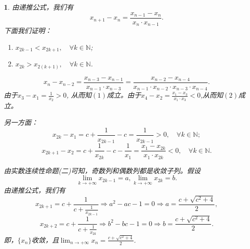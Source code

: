 \documentclass[utf8]{book}
\newtheorem{solution}{}
\begin{document}
\begin{solution}
由递推公式，我们有
$$x_{n+1}-x_{n} = \frac{x_{n-1}- x_n}{x_n\cdot x_{n-1}}.$$
下面我们证明：
\renewcommand\labelenumi{\normalfont(\theenumi)}
\begin{enumerate}
\item $x_{2k-1} < x_{2k+1},\quad\forall k\in\mathbb{N}$;
\item $x_{2k} > x_{2(k+1)},\quad\forall k\in\mathbb{N}$.
\end{enumerate}
$$x_{n}-x_{n-2} = \frac{x_{n-3} - x_{n-1}}{x_{n-1}\cdot x_{n-3}} = \frac{x_{n-2} - x_{n-4}}{x_{n-1}\cdot x_{n-2}\cdot x_{n-3}\cdot x_{n-4}}.$$
由于$x_3-x_1 = \displaystyle\frac{1}{x_2} > 0$, 从而知$(1)$成立。由于$x_4-x_2 = \displaystyle\frac{x_1-x_3}{x_1\cdot x_3} < 0$,从而知$(2)$成立。

另一方面：
$$x_{2k}-x_1 = c+\frac{1}{x_{2k-1}}-c = \frac{1}{x_{2k-1}} > 0,\quad \forall k\in\mathbb{N};$$
$$x_{2k+1} - x_2 = c+\frac{1}{x_{2k}} - c -\frac{1}{x_1} = \frac{x_1 - x_{2k}}{x_1\cdot x_{2k}} < 0,\quad\forall k\in\mathbb{N}.$$

由实数连续性命题(二)可知，奇数列和偶数列都是收敛子列。假设
$$\displaystyle \lim_{k\to +\infty}x_{2k-1} = a, \lim_{k\to +\infty}x_{2k} = b.$$
由递推公式，我们有
$$x_{2k+1} =c+\frac{1}{c+\frac{1}{x_{2k-1}}}\Rightarrow a^2-ac-1 = 0\Rightarrow a = \frac{c+\sqrt{c^2 + 4}}{2},$$
$$x_{2k+2} =c+\frac{1}{c+\frac{1}{x_{2k}}}\Rightarrow b^2-bc-1 = 0\Rightarrow b = \frac{c+\sqrt{c^2 + 4}}{2}.$$
即，$\{x_n\}$收敛，且$\displaystyle \lim_{n\to +\infty}x_n=\frac{c+\sqrt{c^2+4}}{2}$.
\end{solution}
\end{document}
